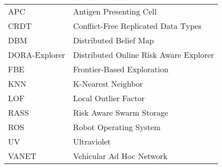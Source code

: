 \chapter*{\abbrevname}
\pagestyle{pagenumber}
%
\begin{acronym}
\end{acronym}
%
\begin{longtable}{lp{5in}}
APC         & Antigen Presenting Cell\\ %
CRDT         & Conflict-Free Replicated Data Types\\ %
DBM          & Distributed Belief Map\\ %
DORA-Explorer& Distributed Online Risk Aware Explorer\\ %
FBE          & Frontier-Based Exploration\\ %
KNN          & K-Nearest Neighbor\\ %
LOF          & Local Outlier Factor\\
RASS         & Risk Aware Swarm Storage\\%
ROS          & Robot Operating System\\%
UV           & Ultraviolet\\%
VANET        & Vehicular Ad Hoc Network\\%
\end{longtable}
